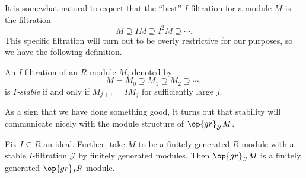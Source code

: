 It is somewhat natural to expect that the ``best'' $I$-filtration for a module $M$ is the filtration
\[M\supseteq IM\supseteq I^2M\supseteq\cdots.\]
This specific filtration will turn out to be overly restrictive for our purposes, so we have the following definition.
\begin{definition}[Stable]
	An $I$-filtration of an $R$-module $M$, denoted by
	\[M=M_0\supseteq M_1\supseteq M_2\supseteq\cdots,\]
	is \textit{$I$-stable} if and only if $M_{j+1}=IM_j$ for sufficiently large $j$.
\end{definition}
As a sign that we have done something good, it turns out that stability will communicate nicely with the module structure of $\op{gr}_\mathcal JM$.
\begin{proposition}
	Fix $I\subseteq R$ an ideal. Further, take $M$ to be a finitely generated $R$-module with a stable $I$-filtration $\mathcal J$ by finitely generated modules. Then $\op{gr}_\mathcal JM$ is a finitely generated $\op{gr}_IR$-module.
\end{proposition}
